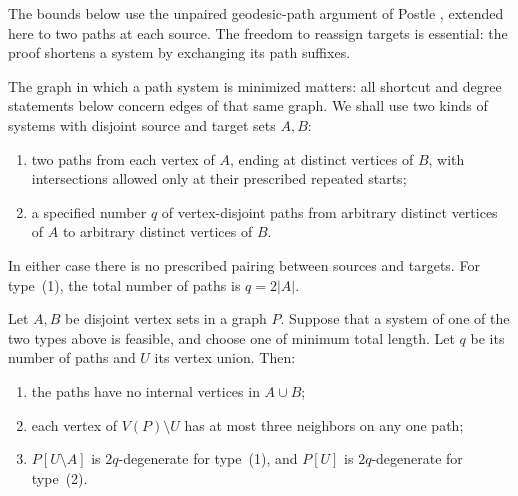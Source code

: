 The bounds below use the unpaired geodesic-path argument of Postle
\cite[Lemma~4.14]{Postle2020}, extended here to two paths at each source.
The freedom to reassign targets is essential: the proof shortens a
system by exchanging its path suffixes.

The graph in which a path system is minimized matters: all shortcut and
degree statements below concern edges of that same graph.  We shall use
two kinds of systems with disjoint source and target sets $A,B$:
\begin{enumerate}[label=\textup{(\arabic*)}]
\item two paths from each vertex of $A$, ending at distinct vertices of
      $B$, with intersections allowed only at their prescribed repeated
      starts;
\item a specified number $q$ of vertex-disjoint paths from arbitrary
      distinct vertices of $A$ to arbitrary distinct vertices of $B$.
\end{enumerate}
In either case there is no prescribed pairing between sources and targets.
For type~\textup{(1)}, the total number of paths is $q=2|A|$.

\begin{lemma}
\label{lem:path-minimization}
Let $A,B$ be disjoint vertex sets in a graph $P$.  Suppose that a system
of one of the two types above is feasible, and choose one of minimum
total length.  Let $q$ be its number of paths and $U$ its vertex union.
Then:
\begin{enumerate}[label=(\roman*)]
\item the paths have no internal vertices in $A\cup B$;
\item each vertex of $V(P)\setminus U$ has at most three neighbors
      on any one path;
\item $P[U\setminus A]$ is $2q$-degenerate for type~\textup{(1)},
      and $P[U]$ is $2q$-degenerate for type~\textup{(2)}.
\end{enumerate}
\end{lemma}

